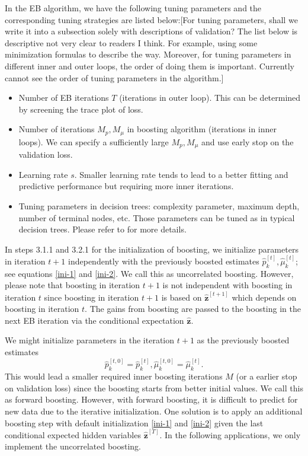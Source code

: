 \documentclass[11pt]{article}
\numberwithin{equation}{section}
\def\bz{\boldsymbol{z}}
\begin{document}
In the EB algorithm, we have the following tuning parameters and the corresponding tuning strategies are listed below:{\color{blue}[For tuning parameters, shall we write it into a subsection solely with descriptions of validation? The list below is descriptive not very clear to readers I think. For example, using some minimization formulas to describe the way. Moreover, for tuning parameters in different inner and outer loops, the order of doing them is important. Currently cannot see the order of tuning parameters in the algorithm.]}
	\begin{itemize}
		\item Number of EB iterations {$T$} (iterations in outer loop). This can be determined by screening the trace plot of loss. 
		\item Number of iterations {$M_p,M_\mu$} in boosting algorithm  (iterations in inner loops). We can specify a sufficiently large $M_p,M_\mu$ and use  early stop on the validation loss.
		\item Learning rate {$s$}. Smaller learning rate tends to lead to a better fitting and predictive performance but requiring more inner iterations.
		\item Tuning parameters in decision trees: complexity parameter, maximum depth, number of terminal nodes, etc.
		Those parameters can be tuned as in typical decision trees. Please refer to \citet{hastie2009elements} for more details.
 	\end{itemize}

	In steps 3.1.1 and 3.2.1 for the initialization of boosting, 
	we initialize parameters in iteration $t+1$ {independently} with the previously boosted estimates $\hat{p}_k^{[t]}, \hat{\mu}_k^{[t]}$; see equations \eqref{ini-1} and \eqref{ini-2}. 
	We call this as uncorrelated boosting.
	However, please note that boosting in iteration $t+1$ is not independent with boosting in iteration $t$ since boosting in iteration $t+1$ is based on $\hat{\bz}^{[t+1]}$ which depends on boosting in iteration $t$. The gains from boosting are passed to  the boosting in the next EB iteration via the conditional expectation $\hat{\bz}$. 
	
	
	We might initialize parameters in the iteration $t+1$ as the previously boosted estimates $$\hat{p}_k^{[t,0]}=\hat{p}_k^{[t]}, \hat{\mu}_k^{[t,0]}=\hat{\mu}_k^{[t]}.$$
This would lead a {smaller} required inner boosting iterations $M$ (or a {earlier} stop on validation loss) since the boosting starts from better initial values.
	We call this as forward boosting. 
	However, with forward boosting, it is difficult to predict for new data due to the {iterative initialization}. One solution is to apply an additional boosting step with default initialization \eqref{ini-1} and \eqref{ini-2} given the {last conditional expected hidden variables $\hat{\bz}^{[T]}$}. In the following applications, we only implement the uncorrelated boosting.
\end{document}
